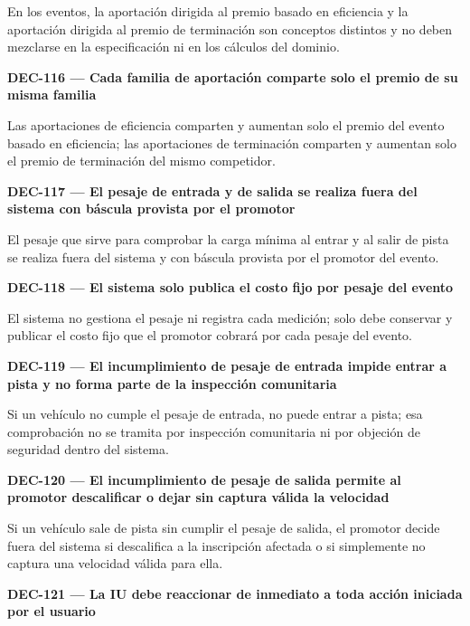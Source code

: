 \documentclass[10pt,letterpaper]{article}
\begin{document}
En los eventos, la aportación dirigida al premio basado en eficiencia y la aportación dirigida al premio de terminación son conceptos distintos y no deben mezclarse en la especificación ni en los cálculos del dominio.\par\vspace{0.45em}
\noindent\textbf{DEC-116 --- Cada familia de aportación comparte solo el premio de su misma familia}\par
Las aportaciones de eficiencia comparten y aumentan solo el premio del evento basado en eficiencia; las aportaciones de terminación comparten y aumentan solo el premio de terminación del mismo competidor.\par\vspace{0.45em}
\noindent\textbf{DEC-117 --- El pesaje de entrada y de salida se realiza fuera del sistema con báscula provista por el promotor}\par
El pesaje que sirve para comprobar la carga mínima al entrar y al salir de pista se realiza fuera del sistema y con báscula provista por el promotor del evento.\par\vspace{0.45em}
\noindent\textbf{DEC-118 --- El sistema solo publica el costo fijo por pesaje del evento}\par
El sistema no gestiona el pesaje ni registra cada medición; solo debe conservar y publicar el costo fijo que el promotor cobrará por cada pesaje del evento.\par\vspace{0.45em}
\noindent\textbf{DEC-119 --- El incumplimiento de pesaje de entrada impide entrar a pista y no forma parte de la inspección comunitaria}\par
Si un vehículo no cumple el pesaje de entrada, no puede entrar a pista; esa comprobación no se tramita por inspección comunitaria ni por objeción de seguridad dentro del sistema.\par\vspace{0.45em}
\noindent\textbf{DEC-120 --- El incumplimiento de pesaje de salida permite al promotor descalificar o dejar sin captura válida la velocidad}\par
Si un vehículo sale de pista sin cumplir el pesaje de salida, el promotor decide fuera del sistema si descalifica a la inscripción afectada o si simplemente no captura una velocidad válida para ella.\par\vspace{0.45em}
\noindent\textbf{DEC-121 --- La IU debe reaccionar de inmediato a toda acción iniciada por el usuario}\par
\end{document}
